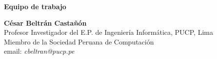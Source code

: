 \begin{center}
{\bf \Huge Equipo de trabajo}
\end{center} 
\vspace{1cm}

% 

\begin{center}
\textbf{César Beltrán Castañón}\\
Profesor Investigador del E.P. de Ingenierí­a Informática, PUCP, Lima\\
Miembro de la Sociedad Peruana de Computación\\
email: \textit{cbeltran@pucp.pe}\\
\end{center}

\newpage
